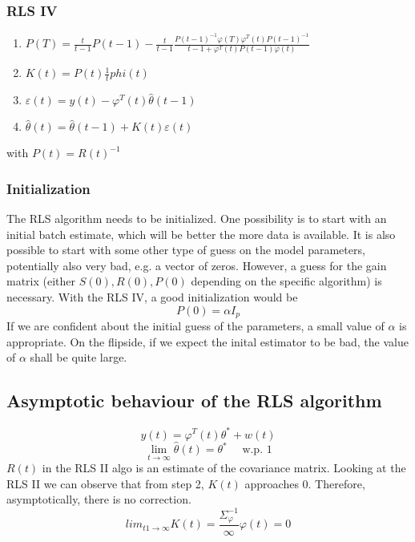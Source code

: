 \documentclass{book}
\theoremstyle{definition}
\theoremstyle{remark}
\theoremstyle{remark}
\begin{document}
\subsubsection{RLS IV}
\begin{enumerate}
    \item $P(T) =\frac{t}{t-1} P(t-1)-\frac{t}{t-1}\frac{P(t-1)^{-1}\varphi(T)\varphi^T(t)P(t-1)^{-1}}{t-1+\varphi^T(t)P(t-1)\varphi(t)}
$
\item $K(t) = P(t)\frac{1}{t}phi(t)$
    \item $\varepsilon(t)=y(t)-\varphi^T(t)\hat{\theta}(t-1)$
    \item $\hat{\theta}(t)=\hat{\theta}(t-1)+K(t)\varepsilon(t)$
\end{enumerate}
with $P(t)=R(t)^{-1}$

\subsubsection{Initialization}
The RLS algorithm needs to be initialized. One possibility is to start with an initial batch estimate, which will be better the more data is available. It is also possible to start with some other type of guess on the model parameters, potentially also very bad, e.g. a vector of zeros. However, a guess for the gain matrix (either $S(0), R(0), P(0)$ depending on the specific algorithm) is necessary. With the RLS IV, a good initialization would be
\[
    P(0)=\alpha I_p
\]
If we are confident about the initial guess of the parameters, a small value of $\alpha$ is appropriate. On the flipside, if we expect the inital estimator to be bad, the value of $\alpha$ shall be quite large.
\subsection{Asymptotic behaviour of the RLS algorithm}

\[
    y(t)=\varphi^T(t)\theta^*+w(t)
\]
\[
    \lim_{t\to\infty}\hat{\theta}(t)=\theta^* \quad \text{ w.p. 1}
\]
$R(t)$ in the RLS II algo is an estimate of the covariance matrix. Looking at the RLS II we can observe that from step 2, $K(t)$ approaches 0. Therefore, asymptotically, there is no correction.
\[
    lim_{t1\to\infty} K(t) = \frac{\Sigma^{-1}_{\varphi}}{\infty}\varphi(t) = 0
\]
\end{document}
